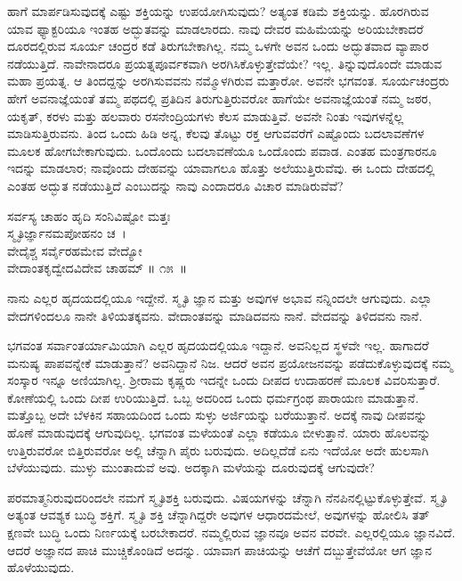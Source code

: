 ಹಾಗೆ ಮಾರ್ಪಡಿಸುವುದಕ್ಕೆ ಎಷ್ಟು ಶಕ್ತಿಯನ್ನು ಉಪಯೋಗಿಸುವುದು? ಅತ್ಯಂತ ಕಡಿಮೆ ಶಕ್ತಿಯನ್ನು. ಹೊರಗಿರುವ ಯಾವ ಫ್ಯಾಕ್ಟರಿಯೂ ಇಂತಹ ಅದ್ಭುತವನ್ನು ಮಾಡಲಾರದು. ನಾವು ದೇವರ ಮಹಿಮೆಯನ್ನು ಅರಿಯಬೇಕಾದರೆ ದೂರದಲ್ಲಿರುವ ಸೂರ್ಯ ಚಂದ್ರರ ಕಡೆ ತಿರುಗಬೇಕಾಗಿಲ್ಲ. ನಮ್ಮ ಒಳಗೇ ಅವನ ಒಂದು ಅದ್ಭುತವಾದ ವ್ಯಾಪಾರ ನಡೆಯುತ್ತಿದೆ. ನಾವೇನಾದರೂ ಪ್ರಯತ್ನಪೂರ್ವಕವಾಗಿ ಅರಗಿಸಿಕೊಳ್ಳುತ್ತೇವೆಯೇ? ಇಲ್ಲ. ತಿನ್ನುವುದೊಂದೇ ಮಾಡುವ ಮಹಾ ಪ್ರಯತ್ನ. ಆ ತಿಂದದ್ದನ್ನು ಅರಗಿಸುವವನು ನಮ್ಮೊಳಗಿರುವ ಮತ್ತಾರೋ. ಅವನೇ ಭಗವಂತ. ಸೂರ್ಯಚಂದ್ರರು ಹೇಗೆ ಅವನಾಜ್ಞೆಯಂತೆ ತಮ್ಮ ಪಥದಲ್ಲಿ ಪ್ರತಿದಿನ ತಿರುಗುತ್ತಿರುವರೋ ಹಾಗೆಯೇ ಅವನಾಜ್ಞೆಯಂತೆ ನಮ್ಮ ಜಠರ, ಯಕೃತ್, ಕರಳು ಮತ್ತು ಹಲವಾರು ರಸನೇಂದ್ರಿಯಗಳು ಕೆಲಸ ಮಾಡುತ್ತಿವೆ. ಅವನೇ ನಿಂತು ಇವುಗಳನ್ನೆಲ್ಲ ಮಾಡಿಸುತ್ತಿರು\-ವನು. ತಿಂದ ಒಂದು ಹಿಡಿ ಅನ್ನ, ಕೆಲವು ತೊಟ್ಟು ರಕ್ತ ಆಗುವವರೆಗೆ ಎಷ್ಟೊಂದು ಬದಲಾವಣೆಗಳ ಮೂಲಕ ಹೋಗಬೇಕಾಗುವುದು. ಒಂದೊಂದು ಬದಲಾವಣೆಯೂ ಒಂದೊಂದು ಪವಾಡ. ಎಂತಹ ಮಂತ್ರಗಾರನೂ ಇದನ್ನು ಮಾಡಲಾರ; ನಾವೊಂದು ದೇಹವನ್ನು ಯಾವಾಗಲೂ ಹೊತ್ತು ಅಲೆಯುತ್ತಿರುವೆವು. ಈ ಒಂದು ದೇಹದಲ್ಲಿ ಎಂತಹ ಅದ್ಭುತ ನಡೆಯುತ್ತಿದೆ ಎಂಬುದನ್ನು ನಾವು ಎಂದಾದರೂ ವಿಚಾರ ಮಾಡಿರುವೆವೆ?

\begin{shloka}
ಸರ್ವಸ್ಯ ಚಾಹಂ ಹೃದಿ ಸಂನಿವಿಷ್ಟೋ ಮತ್ತಃ\\ ಸ್ಮೃತಿರ್ಜ್ಞಾನಮಪೋಹನಂ ಚ~।\\ವೇದೈಶ್ಚ ಸರ್ವೈರಹಮೇವ ವೇದ್ಯೋ\\ ವೇದಾಂತಕೃದ್ವೇದವಿದೇವ ಚಾಹಮ್ \hfill॥ ೧೫~॥
\end{shloka}

\begin{artha}
ನಾನು ಎಲ್ಲರ ಹೃದಯದಲ್ಲಿಯೂ ಇದ್ದೇನೆ. ಸ್ಮೃತಿ ಜ್ಞಾನ ಮತ್ತು ಅವುಗಳ ಅಭಾವ ನನ್ನಿಂದಲೇ ಆಗುವುದು. ಎಲ್ಲಾ ವೇದಗಳಿಂದಲೂ ನಾನೇ ತಿಳಿಯತಕ್ಕವನು. ವೇದಾಂತವನ್ನು ಮಾಡಿದವನು ನಾನೆ. ವೇದವನ್ನು ತಿಳಿದವನು ನಾನೆ.
\end{artha}

ಭಗವಂತ ಸರ್ವಾಂತರ್ಯಾಮಿಯಾಗಿ ಎಲ್ಲರ ಹೃದಯದಲ್ಲಿಯೂ ಇದ್ದಾನೆ. ಅವನಿಲ್ಲದ ಸ್ಥಳವೇ ಇಲ್ಲ. ಹಾಗಾದರೆ ಮನುಷ್ಯ ಪಾಪವನ್ನೇಕೆ ಮಾಡುತ್ತಾನೆ? ಅವನಿದ್ದಾನೆ ನಿಜ. ಆದರೆ ಅವನ ಪ್ರಯೋಜನವನ್ನು ಪಡೆದುಕೊಳ್ಳುವುದಕ್ಕೆ ನಮ್ಮ ಸಂಸ್ಕಾರ ಇನ್ನೂ ಅಣಿಯಾಗಿಲ್ಲ. ಶ‍್ರೀರಾಮ ಕೃಷ್ಣರು ಇದನ್ನೇ ಒಂದು ದೀಪದ ಉದಾಹರಣೆ ಮೂಲಕ ವಿವರಿಸುತ್ತಾರೆ. ಕೋಣೆಯಲ್ಲಿ ಒಂದು ದೀಪ ಉರಿಯುತ್ತಿದೆ. ಒಬ್ಬ ಅದರಿಂದ ಒಂದು ಧರ್ಮಗ್ರಂಥ ಪಾರಾಯಣ ಮಾಡುತ್ತಾನೆ. ಮತ್ತೊಬ್ಬ ಅದೇ ಬೆಳಕಿನ ಸಹಾಯದಿಂದ ಒಂದು ಸುಳ್ಳು ಅರ್ಜಿಯನ್ನು ಬರೆಯುತ್ತಾನೆ. ಅದಕ್ಕೆ ನಾವು ದೀಪವನ್ನು ಹೊಣೆ ಮಾಡುವುದಕ್ಕೆ ಆಗುವುದಿಲ್ಲ. ಭಗವಂತ ಮಳೆಯಂತೆ ಎಲ್ಲಾ ಕಡೆಯೂ ಬೀಳುತ್ತಾನೆ. ಯಾರು ಹೊಲವನ್ನು ಉತ್ತಿರುವರೋ ಬಿತ್ತಿರುವರೋ ಅಲ್ಲಿ ಚೆನ್ನಾಗಿ ಪೈರು ಬರುವುದು. ಅದಿಲ್ಲದೆಡೆ ಏನು ಇದೆಯೋ ಅದೇ ಹುಲಸಾಗಿ ಬೆಳೆಯುವುದು. ಮುಳ್ಳು ಮುಂತಾದುವೆ ಅವು. ಅದಕ್ಕಾಗಿ ಮಳೆಯನ್ನು ದೂರುವುದಕ್ಕೆ ಆಗುವುದೇ?

ಪರಮಾತ್ಮನಿರುವುದರಿಂದಲೇ ನಮಗೆ ಸ್ಮೃತಿಶಕ್ತಿ ಬರುವುದು. ವಿಷಯಗಳನ್ನು ಚೆನ್ನಾಗಿ ನೆನಪಿನಲ್ಲಿಟ್ಟುಕೊಳ್ಳುತ್ತೇವೆ. ಸ್ಮೃತಿ ಅತ್ಯಂತ ಆವಶ್ಯಕ ಬುದ್ಧಿ ಶಕ್ತಿಗೆ. ಸ್ಮೃತಿ ಶಕ್ತಿ ಚೆನ್ನಾಗಿದ್ದರೇ ಅವುಗಳ ಆಧಾರದಮೇಲೆ, ಅವುಗಳನ್ನು ಹೋಲಿಸಿ ತತ್​ಕ್ಷಣವೇ ಬುದ್ಧಿ ಒಂದು ನಿರ್ಣಯಕ್ಕೆ ಬರಬೇಕಾದರೆ. ನಮ್ಮಲ್ಲಿರುವ ಜ್ಞಾನವೂ ಅವನ ವರವೇ. ಎಲ್ಲರಲ್ಲಿಯೂ ಜ್ಞಾನವಿದೆ. ಆದರೆ ಅಜ್ಞಾನದ ಪಾಚಿ ಮುಚ್ಚಿಕೊಂಡಿದೆ ಅದನ್ನು. ಯಾವಾಗ ಪಾಚಿಯನ್ನು ಆಚೆಗೆ ದಬ್ಬುತ್ತೇವೆಯೋ ಆಗ ಜ್ಞಾನ ಹೊಳೆಯುವುದು.

